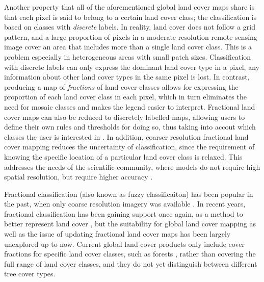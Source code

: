 \documentclass[10pt]{article}
\begin{document}
\begin{mdframed}[style=table,frametitle=\textbf{7. DETAILED DESCRIPTION OF THE RESEARCH PLAN} (max. 2500 words + 1 page literature list)]
Another property that all of the aforementioned global land cover maps share is that each pixel is said to belong to a certain land cover class; the classification is based on classes with \textit{discrete} labels. In reality, land cover does not follow a grid pattern, and a large proportion of pixels in a moderate resolution remote sensing image cover an area that includes more than a single land cover class. This is a problem especially in heterogeneous areas with small patch sizes. Classification with discrete labels can only express the dominant land cover type in a pixel, any information about other land cover types in the same pixel is lost. In contrast, producing a map of \textit{fractions} of land cover classes allows for expressing the proportion of each land cover class in each pixel, which in turn eliminates the need for mosaic classes and makes the legend easier to interpret. Fractional land cover maps can also be reduced to discretely labelled maps, allowing users to define their own rules and thresholds for doing so, thus taking into accout which classes the user is interested in \citep{tsendbazar_integrating_2017}. In addition, coarser resolution fractional land cover mapping reduces the uncertainty of classification, since the requirement of knowing the specific location of a particular land cover class is relaxed. This addresses the needs of the scientific community, where models do not require high spatial resolution, but require higher accuracy \citep{bontemps_revisiting_2012}.

Fractional classification (also known as fuzzy classificaiton) has been popular in the past, when only coarse resolution imagery was available \citep{foody_approaches_1996, adams_classification_1995, amo_spectral_2002}. In recent years, fractional classification has been gaining support once again, as a method to better represent land cover \citep{gessner_estimating_2013}, but the suitability for global land cover mapping as well as the issue of updating fractional land cover maps has been largely unexplored up to now. Current global land cover products only include cover fractions for specific land cover classes, such as forests \citep{hansen_global_2003}, rather than covering the full range of land cover classes, and they do not yet distinguish between different tree cover types.



\end{mdframed}
\end{document}
